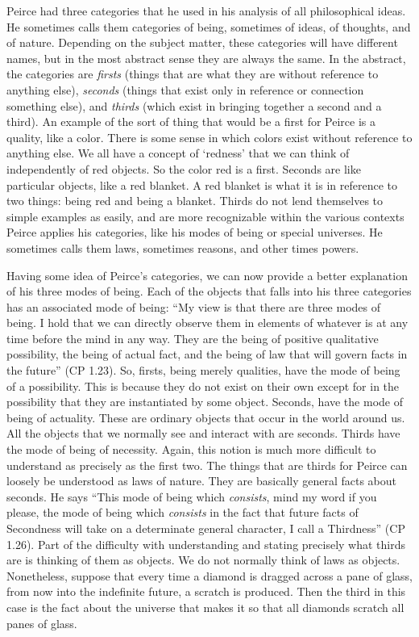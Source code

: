 Peirce had three categories that he used in his analysis of all philosophical ideas. He sometimes calls them categories of being, sometimes of ideas, of thoughts, and of nature. Depending on the subject matter, these categories will have different names, but in the most abstract sense they are always the same. In the abstract, the categories are \textit{firsts} (things that are what they are without reference to anything else), \textit{seconds} (things that exist only in reference or connection something else), and \textit{thirds} (which exist in bringing together a second and a third). An example of the sort of thing that would be a first for Peirce is a quality, like a color. There is some sense in which colors exist without reference to anything else. We all have a concept of `redness' that we can think of independently of red objects. So the color red is a first. Seconds are like particular objects, like a red blanket. A red blanket is what it is in reference to two things: being red and being a blanket. Thirds do not lend themselves to simple examples as easily, and are more recognizable within the various contexts Peirce applies his categories, like his modes of being or special universes. He sometimes calls them laws, sometimes reasons, and other times powers.

Having some idea of Peirce's categories, we can now provide a better explanation of his three modes of being. Each of the objects that falls into his three categories has an associated mode of being: ``My view is that there are three modes of being. I hold that we can directly observe them in elements of whatever is at any time before the mind in any way. They are the being of positive qualitative possibility, the being of actual fact, and the being of law that will govern facts in the future'' (CP 1.23). So, firsts, being merely qualities, have the mode of being of a possibility. This is because they do not exist on their own except for in the possibility that they are instantiated by some object. Seconds, have the mode of being of actuality. These are ordinary objects that occur in the world around us. All the objects that we normally see and interact with are seconds. Thirds have the mode of being of necessity. Again, this notion is much more difficult to understand as precisely as the first two. The things that are thirds for Peirce can loosely be understood as laws of nature. They are basically general facts about seconds. He says ``This mode of being which \textit{consists}, mind my word if you please, the mode of being which \textit{consists} in the fact that future facts of Secondness will take on a determinate general character, I call a Thirdness'' (CP 1.26). Part of the difficulty with understanding and stating precisely what thirds are is thinking of them as objects. We do not normally think of laws as objects. Nonetheless, suppose that every time a diamond is dragged across a pane of glass, from now into the indefinite future, a scratch is produced. Then the third in this case is the fact about the universe that makes it so that all diamonds scratch all panes of glass.


